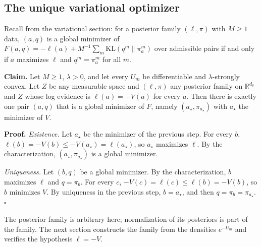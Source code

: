 \documentclass[11pt,a4paper]{report}
\begin{document}
\subsection{\texorpdfstring{The unique variational optimizer}{The unique variational optimizer}}


Recall from the variational section: for a posterior family \((\ell,\pi)\) with \(M\ge1\) data, \((a,q)\) is a global minimizer of \(F(a,q)=-\ell(a)+M^{-1}\sum_m\mathrm{KL}(q^m\|\pi_a^m)\) over admissible pairs if and only if \(a\) maximizes \(\ell\) and \(q^m=\pi_a^m\) for all \(m\).




\textbf{Claim.} Let \(M\ge1\), \(\lambda>0\), and let every \(U_m\) be differentiable and \(\lambda\)-strongly convex. Let \(Z\) be any measurable space and \((\ell,\pi)\) any posterior family on \(\mathbb R^{d_\theta}\) and \(Z\) whose log evidence is \(\ell(a)=-V(a)\) for every \(a\). Then there is exactly one pair \((a,q)\) that is a global minimizer of \(F\), namely \((a_\star,\pi_{a_\star})\) with \(a_\star\) the minimizer of \(V\).




\textbf{Proof.} \emph{Existence.} Let \(a_\star\) be the minimizer of the previous step. For every \(b\), \(\ell(b)=-V(b)\le-V(a_\star)=\ell(a_\star)\), so \(a_\star\) maximizes \(\ell\). By the characterization, \((a_\star,\pi_{a_\star})\) is a global minimizer.




\emph{Uniqueness.} Let \((b,q)\) be a global minimizer. By the characterization, \(b\) maximizes \(\ell\) and \(q=\pi_b\). For every \(c\), \(-V(c)=\ell(c)\le\ell(b)=-V(b)\), so \(b\) minimizes \(V\). By uniqueness in the previous step, \(b=a_\star\), and then \(q=\pi_b=\pi_{a_\star}\). \(\square\)




The posterior family is arbitrary here; normalization of its posteriors is part of the family. The next section constructs the family from the densities \(e^{-U_m}\) and verifies the hypothesis \(\ell=-V\).
\end{document}
